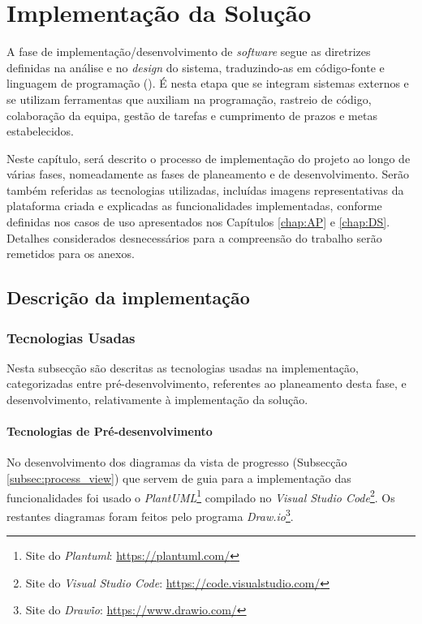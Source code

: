 % 
\chapter{Implementação da Solução} 
\label{chap:Impl}

A fase de implementação/desenvolvimento de \textit{software} segue as diretrizes definidas na análise e no \textit{design} do sistema, traduzindo-as em código-fonte e linguagem de programação (\cite{UBIMINDS2025}). É nesta etapa que se integram sistemas externos e se utilizam ferramentas que auxiliam na programação, rastreio de código, colaboração da equipa, gestão de tarefas e cumprimento de prazos e metas estabelecidos.

Neste capítulo, será descrito o processo de implementação do projeto ao longo de várias fases, nomeadamente as fases de planeamento e de desenvolvimento. Serão também referidas as tecnologias utilizadas, incluídas imagens representativas da plataforma criada e explicadas as funcionalidades implementadas, conforme definidas nos casos de uso apresentados nos Capítulos \ref{chap:AP} e \ref{chap:DS}. Detalhes considerados desnecessários para a compreensão do trabalho serão remetidos para os anexos.


\section{Descrição da implementação} 
\label{sec:desc}

\subsection{Tecnologias Usadas}

Nesta subsecção são descritas as tecnologias usadas na implementação, categorizadas entre pré-desenvolvimento, referentes ao planeamento desta fase, e desenvolvimento, relativamente à implementação da solução.

\subsubsection{Tecnologias de Pré-desenvolvimento}

No desenvolvimento dos diagramas da vista de progresso (Subsecção \ref{subsec:process_view}) que servem de guia para a implementação das funcionalidades foi usado o \textit{PlantUML}\footnote{Site do \textit{Plantuml}: \url{https://plantuml.com/}} compilado no \textit{Visual Studio Code}\footnote{Site do \textit{Visual Studio Code}: \url{https://code.visualstudio.com/}}. Os restantes diagramas foram feitos pelo programa \textit{Draw.io}\footnote{Site do \textit{Draw\.io}: \url{https://www.drawio.com/}}.

